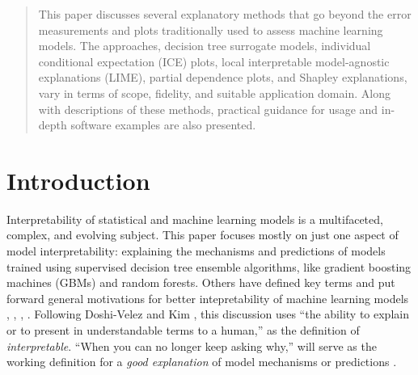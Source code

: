 \documentclass{article}
\begin{document}
 


\begin{abstract} 
	
This paper discusses several explanatory methods that go beyond the error measurements and plots 			traditionally used to assess machine learning models. The approaches, decision tree surrogate models, individual conditional expectation (ICE) plots, local interpretable model-agnostic explanations (LIME), partial dependence plots, and Shapley explanations, vary in terms of scope, fidelity, and suitable application domain. Along with descriptions of these methods, practical guidance for usage and in-depth software examples are also presented.

\end{abstract} 

\section{Introduction}

Interpretability of statistical and machine learning models is a multifaceted, complex, and evolving subject. This paper focuses mostly on just one aspect of model interpretability: explaining the mechanisms and predictions of models trained using supervised decision tree ensemble algorithms, like gradient boosting machines (GBMs) and random forests. Others have defined key terms and put forward general motivations for better intepretability of machine learning models \cite{lipton1}, \cite{been_kim1}, \cite{gilpin2018explaining}, \cite{guidotti2018survey}. Following Doshi-Velez and Kim , this discussion uses ``the ability to explain or to present in understandable terms to a human,'' as the definition of \textit{interpretable}. ``When you can no longer keep asking why,'' will serve as the working definition for a \textit{good explanation} of model mechanisms or predictions \cite{gilpin2018explaining}. 
	
\end{document}
